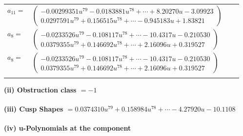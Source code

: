 \documentclass[1p]{elsarticle_modified}
\theoremstyle{definition}
\begin{document}
\begin{tabular}{m{7pt} m{180pt} m{7pt} m{180pt} }
\flushright $a_{11}=$&$\begin{pmatrix}-0.00299351 u^{79}-0.0183881 u^{78}+\cdots+8.20270 u-3.09923\\0.0297591 u^{79}+0.156515 u^{78}+\cdots-0.945183 u+1.83821\end{pmatrix}$ \\
\flushright $a_{8}=$&$\begin{pmatrix}-0.0233526 u^{79}-0.108117 u^{78}+\cdots-10.4317 u-0.210530\\0.0379355 u^{79}+0.146692 u^{78}+\cdots+2.16096 u+0.319527\end{pmatrix}$\\ \flushright $a_{8}=$&$\begin{pmatrix}-0.0233526 u^{79}-0.108117 u^{78}+\cdots-10.4317 u-0.210530\\0.0379355 u^{79}+0.146692 u^{78}+\cdots+2.16096 u+0.319527\end{pmatrix}$\\&\end{tabular}
\flushleft \textbf{(ii) Obstruction class $= -1$}\\~\\
\flushleft \textbf{(iii) Cusp Shapes $= 0.0374310 u^{79}+0.158984 u^{78}+\cdots-4.27920 u-10.1108$}\\~\\
\newpage\renewcommand{\arraystretch}{1}
\flushleft \textbf{(iv) u-Polynomials at the component}\newline \\
\end{document}
